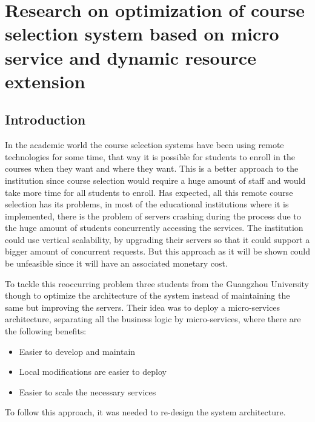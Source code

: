 \documentclass[14pt]{extarticle}
\begin{document}
\section{Research on optimization of course selection system based on micro service and dynamic resource extension}
\subsection{Introduction}
In the academic world the course selection systems have been using remote technologies for some time, that way it is possible for students to enroll in the courses when they want and where they want. This is a better approach to the institution since course selection would require a huge amount of staff and would take more time for all students to enroll. 
Has expected, all this remote course selection has its problems, in most of the educational institutions where it is implemented, there is the problem of servers crashing during the process due to the huge amount of students concurrently accessing the services. 
The institution could use vertical scalability, by upgrading their servers so that it could support a bigger amount of concurrent requests. But this approach as it will be shown could be unfeasible since it will have an associated monetary cost.

To tackle this reoccurring problem three students from the Guangzhou University though to optimize the architecture of the system instead of maintaining the same but improving the servers. Their idea was to deploy a micro-services architecture, separating all the business logic by micro-services, where there are the following benefits:
\begin{itemize}
 	\item Easier to develop and maintain
	\item Local modifications are easier to deploy
	\item Easier to scale the necessary services
\end{itemize}

To follow this approach, it was needed to re-design the system architecture.
\end{document}
